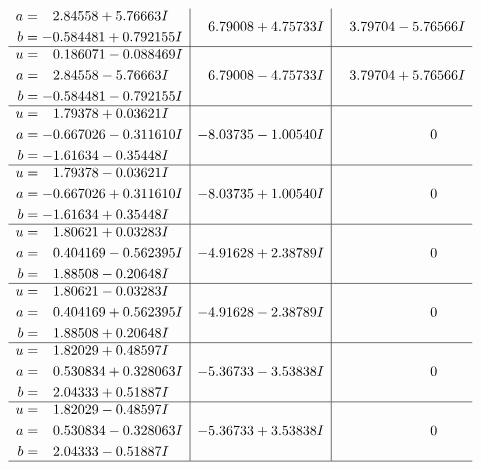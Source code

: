 \documentclass[1p]{elsarticle_modified}
\theoremstyle{definition}
\begin{document}
$$\begin{array}{c|c|c}
\begin{aligned}
a &= \phantom{-}2.84558 + 5.76663 I \\
b &= -0.584481 + 0.792155 I\end{aligned}
 & \phantom{-}6.79008 + 4.75733 I & \phantom{-}3.79704 - 5.76566 I \\ \hline\begin{aligned}
u &= \phantom{-}0.186071 - 0.088469 I \\
a &= \phantom{-}2.84558 - 5.76663 I \\
b &= -0.584481 - 0.792155 I\end{aligned}
 & \phantom{-}6.79008 - 4.75733 I & \phantom{-}3.79704 + 5.76566 I \\ \hline\begin{aligned}
u &= \phantom{-}1.79378 + 0.03621 I \\
a &= -0.667026 - 0.311610 I \\
b &= -1.61634 - 0.35448 I\end{aligned}
 & -8.03735 - 1.00540 I & \phantom{-0.000000 } 0 \\ \hline\begin{aligned}
u &= \phantom{-}1.79378 - 0.03621 I \\
a &= -0.667026 + 0.311610 I \\
b &= -1.61634 + 0.35448 I\end{aligned}
 & -8.03735 + 1.00540 I & \phantom{-0.000000 } 0 \\ \hline\begin{aligned}
u &= \phantom{-}1.80621 + 0.03283 I \\
a &= \phantom{-}0.404169 - 0.562395 I \\
b &= \phantom{-}1.88508 - 0.20648 I\end{aligned}
 & -4.91628 + 2.38789 I & \phantom{-0.000000 } 0 \\ \hline\begin{aligned}
u &= \phantom{-}1.80621 - 0.03283 I \\
a &= \phantom{-}0.404169 + 0.562395 I \\
b &= \phantom{-}1.88508 + 0.20648 I\end{aligned}
 & -4.91628 - 2.38789 I & \phantom{-0.000000 } 0 \\ \hline\begin{aligned}
u &= \phantom{-}1.82029 + 0.48597 I \\
a &= \phantom{-}0.530834 + 0.328063 I \\
b &= \phantom{-}2.04333 + 0.51887 I\end{aligned}
 & -5.36733 - 3.53838 I & \phantom{-0.000000 } 0 \\ \hline\begin{aligned}
u &= \phantom{-}1.82029 - 0.48597 I \\
a &= \phantom{-}0.530834 - 0.328063 I \\
b &= \phantom{-}2.04333 - 0.51887 I\end{aligned}
 & -5.36733 + 3.53838 I & \phantom{-0.000000 } 0\\
 \hline 
 \end{array}$$\newpage\newpage\renewcommand{\arraystretch}{1}
\end{document}
